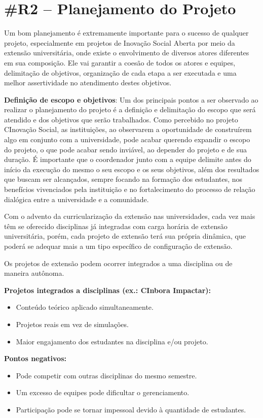 \section*{\#R2 – Planejamento do Projeto}

Um bom planejamento é extremamente importante para o sucesso de qualquer projeto, especialmente em projetos de Inovação Social Aberta por meio da extensão universitária, onde existe o envolvimento de diversos atores diferentes em sua composição. Ele vai garantir a coesão de todos os atores e equipes, delimitação de objetivos, organização de cada etapa a ser executada e uma melhor assertividade no atendimento destes objetivos.

\textbf{Definição de escopo e objetivos}:
Um dos principais pontos a ser observado ao realizar o planejamento do projeto é a definição e delimitação do escopo que será atendido e dos objetivos que serão trabalhados. Como percebido no projeto CInovação Social, as instituições, ao observarem a oportunidade de construírem algo em conjunto com a universidade, pode acabar querendo expandir o escopo do projeto, o que pode acabar sendo inviável, ao depender do projeto e de sua duração. É importante que o coordenador junto com a equipe delimite antes do início da execução do mesmo o seu escopo e os seus objetivos, além dos resultados que buscam ser alcançados, sempre focando na formação dos estudantes, nos benefícios vivenciados pela instituição e no fortalecimento do processo de relação dialógica entre a universidade e a comunidade.

Com o advento da curricularização da extensão nas universidades, cada vez mais têm se oferecido disciplinas já integradas com carga horária de extensão universitária, porém, cada projeto de extensão terá sua própria dinâmica, que poderá se adequar mais a um tipo específico de configuração de extensão.

Os projetos de extensão podem ocorrer integrados a uma disciplina ou de maneira autônoma.

\textbf{Projetos integrados a disciplinas (ex.: CInbora Impactar):}
\begin{itemize}
    \item Conteúdo teórico aplicado simultaneamente.
    \item Projetos reais em vez de simulações.
    \item Maior engajamento dos estudantes na disciplina e/ou projeto.
\end{itemize}

\textbf{Pontos negativos:}
\begin{itemize}
    \item Pode competir com outras disciplinas do mesmo semestre.
    \item Um excesso de equipes pode dificultar o gerenciamento.
    \item Participação pode se tornar impessoal devido à quantidade de estudantes.
\end{itemize}


